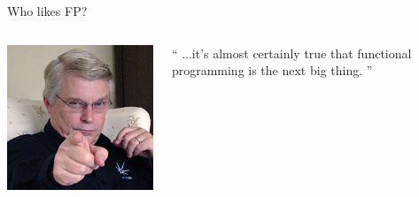 \documentclass[mathserif]{beamer}
\begin{document}
\begin{frame}{Who likes FP?}
\begin{columns}[t]
  \end{columns}

  \vskip5mm

  \begin{columns}[t]
    \begin{column}[T]{2cm}
      \includegraphics[scale=0.2]{img/uncle_bob_martin.jpg}
    \end{column}

    \begin{column}[T]{8cm}
      {\large ``
        ...it’s almost certainly true that functional programming is the next big thing.
        ''}
      \vskip5mm
      \hspace*{}
    \end{column}
  \end{columns}

\end{frame}
\end{document}
